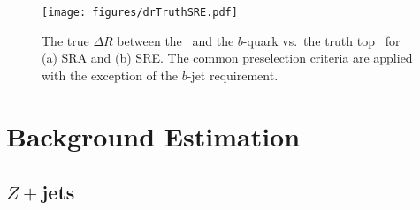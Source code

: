 \begin{figure}[h]
	\centering
	\texttt{[image: figures/drTruthSRE.pdf]}
	\caption[$\Delta R$ between the \Wboson\ and the $b$-quark vs. the top \pt]{The true $\Delta R$ between the \Wboson\ and the $b$-quark vs.\ the truth top \pt\ for (a) SRA and (b) SRE. The common preselection criteria are applied with the exception of the $b$-jet requirement.}
	\label{fig:SRBoost_dRWb}
\end{figure}

\section{Background Estimation}
\label{sec:backgroundEstimation}










\subsection{\boldmath$Z+$jets}

